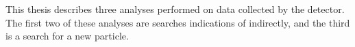This thesis describes three analyses performed on data collected by the \lhcb detector.
The first two of these analyses are searches indications of \np indirectly, and the third is a
search for a new particle.




\clearpage





%
%
%
